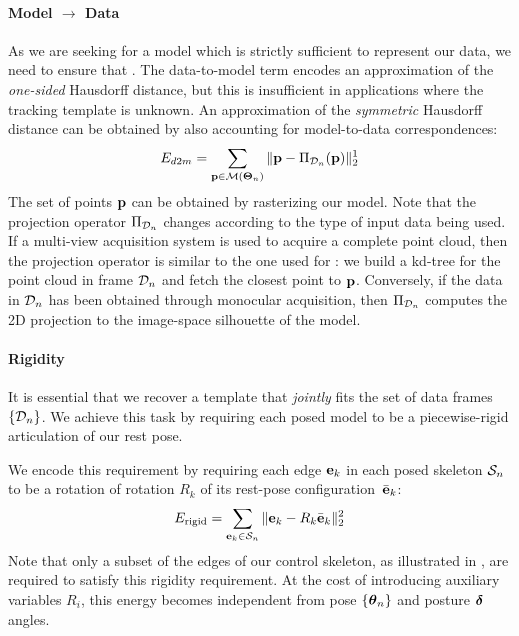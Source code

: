 \paragraph{Model $\rightarrow$ Data}
As we are seeking for a model which is strictly sufficient to represent our data, we need to ensure that  . The data-to-model term encodes an approximation of the \emph{one-sided} Hausdorff distance, but this is insufficient in applications where the tracking template is unknown. An approximation of the \emph{symmetric} Hausdorff distance can be obtained by also accounting for model-to-data correspondences:
\begin{equation}
E_{d2m} = \sum_{\mathbf{p} \in \mathcal{M}(\boldsymbol{\Theta}_n)} \| \mathbf{p} - \Pi_{\mathcal{D}_n}(\mathbf{p})\|_2^1
\label{eq:m2d}
\end{equation}
The set of points $\mathbf{p}$ can be obtained by rasterizing our model. Note that the projection operator $\Pi_{\mathcal{D}_n}$ changes according to the type of input data being used. If a multi-view acquisition system is used to acquire a complete point cloud, then the projection operator is similar to the one used for : we build a kd-tree for the point cloud in frame $\mathcal{D}_n$ and fetch the closest point to $\mathbf{p}$. Conversely, if the data in $\mathcal{D}_n$ has been obtained through monocular acquisition, then $\Pi_{\mathcal{D}_n}$ computes the 2D projection to the image-space silhouette of the model.

\paragraph{Rigidity}
It is essential that we recover a template that \emph{jointly} fits the set of data frames $\{ \mathcal{D}_n \}$. We achieve this task by requiring each posed model to be a piecewise-rigid articulation of our rest pose.
\begin{DRAFT}
We encode this requirement by requiring each edge $\mathbf{e}_k$ in each posed skeleton $\mathcal{S}_n$ to be a rotation of rotation $R_{k}$ of its rest-pose configuration~$\bar{\mathbf{e}}_k$:
% 
\begin{equation}
E_{\text{rigid}} = \sum_{\mathbf{e}_k \in \mathcal{S}_n} \| \mathbf{e}_k  - R_{k}{\bar{\mathbf{e}}_k} \|_2^2
\label{eq:rigidity}
\end{equation} 
Note that only a subset of the edges of our control skeleton, as illustrated in , are required to satisfy this rigidity requirement. At the cost of introducing auxiliary variables $R_{i}$, this energy becomes independent from pose ${\{\boldsymbol{\theta}_n\}}$ and posture $\boldsymbol{\delta}$ angles.
\end{DRAFT}

